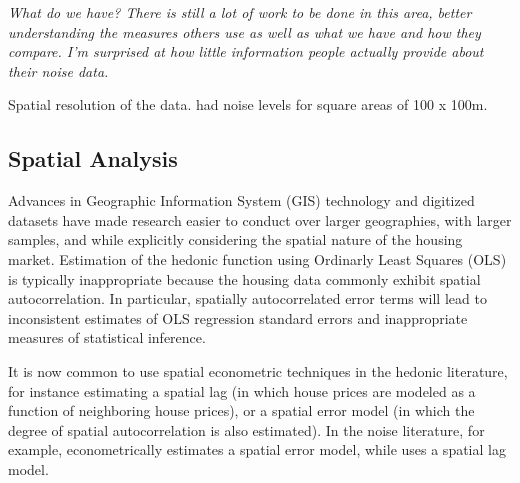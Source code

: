 \documentclass{article}\usepackage{graphicx, color}
\begin{document}
\emph{What do we have? There is still a lot of work to be done in this area, better understanding the measures others use as well as what we have and how they compare. I'm surprised at how little information people actually provide about their noise data.}

Spatial resolution of the data. \citet{Theebe2004a} had noise levels for square areas of 100 x 100m.

% 


\subsection{Spatial Analysis}
Advances in Geographic Information System (GIS) technology and digitized datasets have made research easier to conduct over larger geographies, with larger samples, and while explicitly considering the spatial nature of the housing market. Estimation of the hedonic function using Ordinarly Least Squares (OLS) is typically inappropriate because the housing data commonly exhibit spatial autocorrelation. In particular, spatially autocorrelated error terms will lead to inconsistent estimates of OLS regression standard errors and inappropriate measures of statistical inference. 

It is now common to use spatial econometric techniques in the hedonic literature, for instance estimating a spatial lag (in which house prices are modeled as a function of neighboring house prices), or a spatial error model (in which the degree of spatial autocorrelation is also estimated). In the noise literature, for example, \citet{Theebe2004a} econometrically estimates a spatial error model, while \citet{Andersson2010} uses a spatial lag model.
\end{document}
